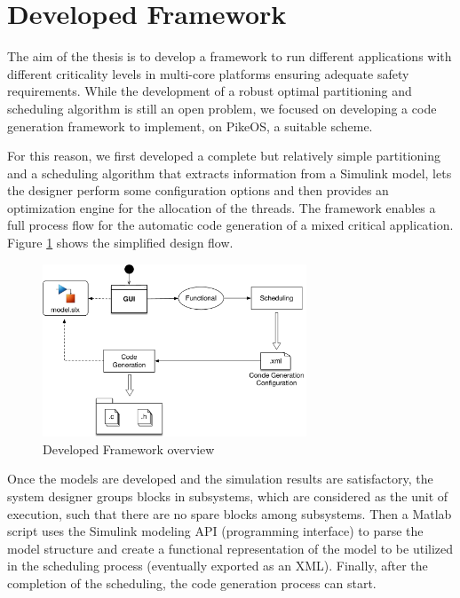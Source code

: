 \section{Developed Framework}\label{sec:DevelopedFramework}
The aim of the thesis is to develop a framework to run different applications with different criticality levels in multi-core platforms ensuring adequate safety requirements. While the development of a robust optimal partitioning and scheduling algorithm is still an open problem, we focused on developing a code generation framework to implement, on PikeOS, a suitable scheme.
\par For this reason, we first developed a complete but relatively simple partitioning and a scheduling algorithm that extracts information from a Simulink model, lets the designer perform some configuration options and then provides an optimization engine for the allocation of the threads. The framework enables a full process flow for the automatic code generation of a mixed critical application. Figure \ref{fig:FrameworkOverview} shows the simplified design flow.
\begin{figure}[htbp] 
\centering    
\includegraphics[width=0.7\textwidth]{FrameworkOverview}
\caption{Developed Framework overview}
\label{fig:FrameworkOverview}
\end{figure}
\par Once the models are developed and the simulation results are satisfactory, the system designer groups blocks in subsystems, which are considered as the unit of execution, such that there are no spare blocks among subsystems. Then a Matlab script uses the Simulink modeling API (programming interface) to parse the model structure and create a functional representation of the model to be utilized in the scheduling process (eventually exported as an XML). Finally, after the completion of the scheduling, the code generation process can start.

